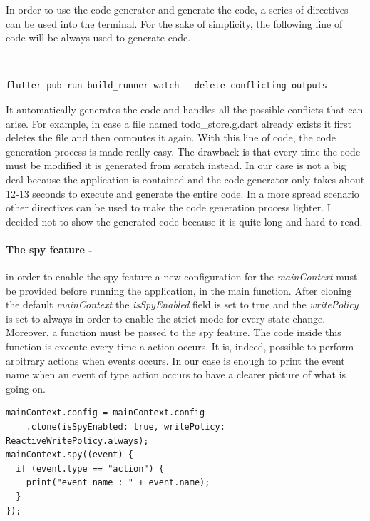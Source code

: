 In order to use the code generator and generate the code, a series of directives can be used into the terminal. For the sake of simplicity, the following line of code will be always used to generate code.
\begin{code}
\mbox{}\\
 \mbox{}
		\label{code:2.14}
\begin{verbatim}
flutter pub run build_runner watch --delete-conflicting-outputs
\end{verbatim}
\mbox{}
\end{code}

It automatically generates the code and handles all the possible conflicts that can arise. For example, in case a file named todo\_store.g.dart already exists it first deletes the file and then computes it again. With this line of code, the code generation process is made really easy. The drawback is that every time the code must be modified it is generated from scratch instead. In our case is not a big deal because the application is contained and the code generator only takes about 12-13 seconds to execute and generate the entire code. In a more spread scenario other directives can be used to make the code generation process lighter. I decided not to show the generated code because it is quite long and hard to read.

\paragraph{The spy feature - }
\label{subpar:todo_app_bloc_core_state} in order to enable the spy feature a new configuration for the \textit{mainContext} must be provided before running the application, in the main function. After cloning the default \textit{mainContext} the \textit{isSpyEnabled} field is set to true and the \textit{writePolicy} is set to always in order to enable the strict-mode for every state change. Moreover, a function must be passed to the spy feature. The code inside this function is execute every time a action occurs. It is, indeed, possible to perform arbitrary actions when events occurs. In our case is enough to print the event name when an event of type action occurs to have a clearer picture of what is going on.

\begin{code}
\mbox{}
 \mbox{}
		\label{code:2.14}
\begin{verbatim}
mainContext.config = mainContext.config
    .clone(isSpyEnabled: true, writePolicy: ReactiveWritePolicy.always);
mainContext.spy((event) {
  if (event.type == "action") {
    print("event name : " + event.name);
  }
});
\end{verbatim}
\mbox{}
\end{code}


